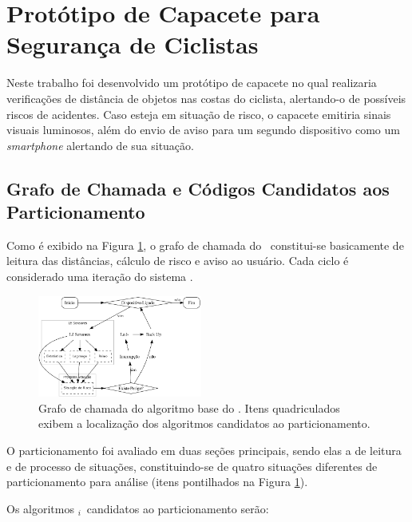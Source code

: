 \section{Protótipo de Capacete para Segurança de Ciclistas} \label{chap:prototipo}

    Neste trabalho foi desenvolvido um protótipo de capacete no qual realizaria verificações de distância de objetos nas costas do ciclista, alertando-o de possíveis riscos de acidentes.
    Caso esteja em situação de risco, o capacete emitiria sinais visuais luminosos, além do envio de aviso para um segundo dispositivo como um \textit{smartphone} alertando de sua situação.
    

    \subsection{Grafo de Chamada e Códigos Candidatos aos Particionamento}
        
        Como é exibido na Figura \ref{fig:gc}, o grafo de chamada do \wearable\ constitui-se basicamente de leitura das distâncias, cálculo de risco e aviso ao usuário.
        Cada ciclo é considerado uma iteração do sistema \wearable.
        
        \begin{figure}[h] \centering
            \vspace{-0.5em}
            \includegraphics[width=0.48\textwidth]{img/capacete.png}
            \caption{Grafo de chamada do algoritmo base do \wearable. Itens quadriculados exibem a localização dos algoritmos candidatos ao particionamento.}
            \label{fig:gc}
        \end{figure}
        
        O particionamento foi avaliado em duas seções principais, sendo elas a de leitura e de processo de situações, constituindo-se de quatro situações diferentes de particionamento para análise (itens pontilhados na Figura \ref{fig:gc}).
        
        Os algoritmos \A$_{i}$\ candidatos ao particionamento serão:
        
